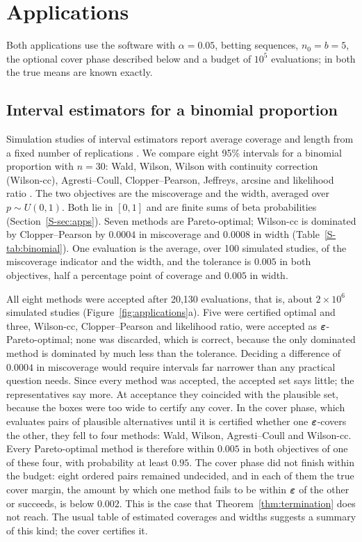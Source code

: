 \section{Applications}\label{sec:applications}

Both applications use the software with $\alpha=0.05$, betting sequences, $n_0=b=5$, the optional cover phase described below and a budget of $10^5$ evaluations; in both the true means are known exactly.

\subsection{Interval estimators for a binomial proportion}\label{sec:app-binomial}

Simulation studies of interval estimators report average coverage and length from a fixed number of replications \citep{morris2019}. We compare eight 95\% intervals for a binomial proportion with $n=30$: Wald, Wilson, Wilson with continuity correction (Wilson-cc), Agresti--Coull, Clopper--Pearson, Jeffreys, arcsine and likelihood ratio \citep{clopper1934,newcombe1998,agresti1998,brown2001}. The two objectives are the miscoverage and the width, averaged over $p\sim U(0,1)$. Both lie in $[0,1]$ and are finite sums of beta probabilities (Section~\ref{S-sec:apps}). Seven methods are Pareto-optimal; Wilson-cc is dominated by Clopper--Pearson by $0.0004$ in miscoverage and $0.0008$ in width (Table~\ref{S-tab:binomial}). One evaluation is the average, over 100 simulated studies, of the miscoverage indicator and the width, and the tolerance is $0.005$ in both objectives, half a percentage point of coverage and $0.005$ in width.

All eight methods were accepted after 20{,}130 evaluations, that is, about $2\times10^6$ simulated studies (Figure~\ref{fig:applications}a). Five were certified optimal and three, Wilson-cc, Clopper--Pearson and likelihood ratio, were accepted as $\bm{\varepsilon}$-Pareto-optimal; none was discarded, which is correct, because the only dominated method is dominated by much less than the tolerance. Deciding a difference of $0.0004$ in miscoverage would require intervals far narrower than any practical question needs. Since every method was accepted, the accepted set says little; the representatives say more. At acceptance they coincided with the plausible set, because the boxes were too wide to certify any cover. In the cover phase, which evaluates pairs of plausible alternatives until it is certified whether one $\bm{\varepsilon}$-covers the other, they fell to four methods: Wald, Wilson, Agresti--Coull and Wilson-cc. Every Pareto-optimal method is therefore within $0.005$ in both objectives of one of these four, with probability at least $0.95$. The cover phase did not finish within the budget: eight ordered pairs remained undecided, and in each of them the true cover margin, the amount by which one method fails to be within $\bm{\varepsilon}$ of the other or succeeds, is below $0.002$. This is the case that Theorem~\ref{thm:termination} does not reach. The usual table of estimated coverages and widths suggests a summary of this kind; the cover certifies it.


